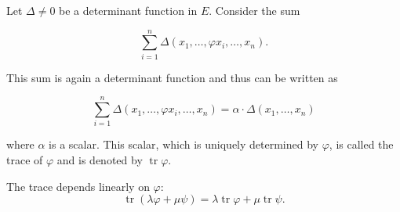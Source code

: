 Let $\Delta \neq 0$ be a determinant function in $E$. Consider the sum

$$\sum_{i=1}^{n} \Delta(x_1, \ldots, \varphi x_i, \ldots, x_n).$$

This sum is again a determinant function and thus can be written as

$$\sum_{i=1}^{n} \Delta(x_1, \ldots, \varphi x_i, \ldots, x_n) = \alpha \cdot \Delta(x_1, \ldots, x_n)$$

where $\alpha$ is a scalar. This scalar, which is uniquely determined by $\varphi$, is called the trace of $\varphi$ and is denoted by $\operatorname{tr} \varphi$.

The trace depends linearly on $\varphi$:
$$\operatorname{tr} (\lambda \varphi + \mu \psi) = \lambda \operatorname{tr} \varphi + \mu \operatorname{tr} \psi.$$
